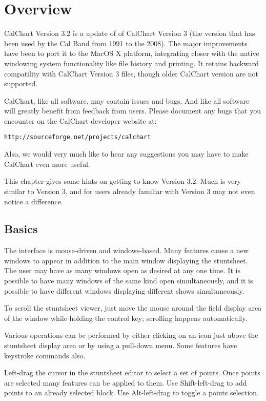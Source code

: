 \chapter{Overview}\label{overview}

CalChart Version 3.2 is a update of of CalChart Version 3 (the version
that has been used by the Cal Band from 1991 to the 2008).  The major
improvements have been to port it to the MacOS X platform, integrating closer
with the native windowing system functionality like file history and printing.
It retains backward compatility with CalChart Version 3 files, though older
CalChart version are not supported.

CalChart, like all software, may contain issues and bugs.  And like all 
software will greatly benefit from feedback from
users.  Please document any bugs that you encounter on the CalChart developer 
website at:

\begin{verbatim}
http://sourceforge.net/projects/calchart
\end{verbatim}

Also, we would very much like to hear any suggestions you may have to make
CalChart even more useful.

This chapter gives some hints on getting to know Version 3.2.  Much is
very similar to Version 3, and for users already familiar with Version 3 may 
not even notice a difference.

\section{Basics}\label{basics}

The interface is mouse-driven and windows-based.  Many features cause a new
windows to appear in addition to the main window displaying the stuntsheet.
The user may have as many windows open as desired at any one time.  It
is possible to have many windows of the same kind open simultaneously,
and it is possible to have different windows displaying different shows
simultaneously.

To scroll the stuntsheet viewer, just move the mouse around the field
display area of the window while holding the control key; scrolling happens
automatically.

Various operations can be performed by either clicking on an icon just
above the stuntsheet display area or by using a pull-down menu.  Some
features have keystroke commands also.

Left-drag the cursor in the stuntsheet editor to select a set of points.
Once points are selected many features can be applied to them.
Use Shift-left-drag to add points to an already selected block.
Use Alt-left-drag to toggle a points selection.

